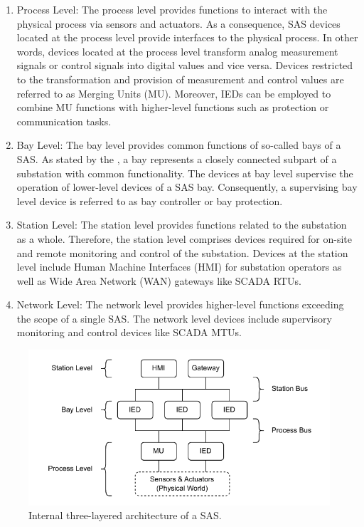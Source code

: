 \begin{enumerate}
    \item Process Level: The process level provides functions to interact with the physical process via sensors and actuators.
    As a consequence, SAS devices located at the process level provide interfaces to the physical process.
    In other words, devices located at the process level transform analog measurement signals or control signals into digital values and vice versa.
    Devices restricted to the transformation and provision of measurement and control values are referred to as Merging Units (MU).
    Moreover, IEDs can be employed to combine MU functions with higher-level functions such as protection or communication tasks.

    \item Bay Level: The bay level provides common functions of so-called bays of a SAS.
    As stated by the \citeauthor{IEC61850P5} \cite{IEC61850P5}, a bay represents a closely connected subpart of a substation with common functionality.
    The devices at bay level supervise the operation of lower-level devices of a SAS bay.
    Consequently, a supervising bay level device is referred to as bay controller or bay protection.

    \item Station Level: The station level provides functions related to the substation as a whole.
    Therefore, the station level comprises devices required for on-site and remote monitoring and control of the substation.
    Devices at the station level include Human Machine Interfaces (HMI) for substation operators as well as Wide Area Network (WAN) gateways like SCADA RTUs.

    \item Network Level: The network level provides higher-level functions exceeding the scope of a single SAS.
    The network level devices include supervisory monitoring and control devices like SCADA MTUs.
\end{enumerate}
\begin{figure}
    \centering
    \includegraphics[width=1.0\linewidth]{figures/substation_architecture.drawio.pdf}
    \caption{Internal three-layered architecture of a SAS.}
    \label{fig:substation_architecture}
\end{figure}

